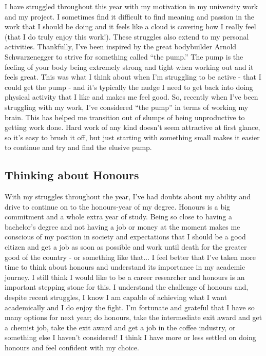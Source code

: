 \documentclass[11pt]{article}
\begin{document}
I have struggled throughout this year with my motivation in my university work and my project. I sometimes find it difficult to find meaning and passion in the work that I should be doing and it feels like a cloud is covering how I really feel (that I do truly enjoy this work!). These struggles also extend to my personal activities. Thankfully, I've been inspired by the great bodybuilder Arnold Schwarzenegger to strive for something called ``the pump.'' The pump is the feeling of your body being extremely strong and tight when working out and it feels great. This was what I think about when I'm struggling to be active - that I could get the pump - and it's typically the nudge I need to get back into doing physical activity that I like and makes me feel good. So, recently when I've been struggling with my work, I've considered ``the pump'' in terms of working my brain. This has helped me transition out of slumps of being unproductive to getting work done. Hard work of any kind doesn't seem attractive at first glance, so it's easy to brush it off, but just starting with something small makes it easier to continue and try and find the elusive pump.

\subsection{Thinking about Honours}

With my struggles throughout the year, I've had doubts about my ability and drive to continue on to the honours-year of my degree. Honours is a big commitment and a whole extra year of study. Being so close to having a bachelor's degree and not having a job or money at the moment makes me conscious of my position in society and expectations that I should be a good citizen and get a job as soon as possible and work until death for the greater good of the country - or something like that... I feel better that I've taken more time to think about honours and understand its importance in my academic journey. I still think I would like to be a career researcher and honours is an important stepping stone for this. I understand the challenge of honours and, despite recent struggles, I know I am capable of achieving what I want academically and I do enjoy the fight. I'm fortunate and grateful that I have so many options for next year; do honours, take the intermediate exit award and get a chemist job, take the exit award and get a job in the coffee industry, or something else I haven't considered! I think I have more or less settled on doing honours and feel confident with my choice.
\end{document}
